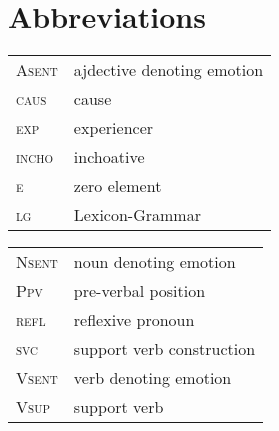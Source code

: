 \documentclass[output=paper]{langsci/langscibook}
\begin{document}
\section*{Abbreviations}
 
\begin{tabularx}{.5\textwidth}{>{\scshape}lQ}
 {A}sent &  ajdective denoting emotion \\
 {caus}   & cause \\
 {exp}   & experiencer  \\
 {incho}   & inchoative  \\
 {e}   & zero element   \\
 {lg}  & Lexicon-Grammar    \\
\end{tabularx}
\begin{tabularx}{.45\textwidth}{>{\scshape}ll}
 {N}sent  &  noun denoting emotion  \\
 {P}pv   & pre-verbal position \\
 {refl}  & reflexive pronoun  \\
 {svc} & support verb construction \\
 {V}sent  &   verb denoting emotion\\
 {V}sup   & support verb  \\
\end{tabularx} 


\sloppy
\printbibliography[heading=subbibliography,notkeyword=this]
\end{document}
